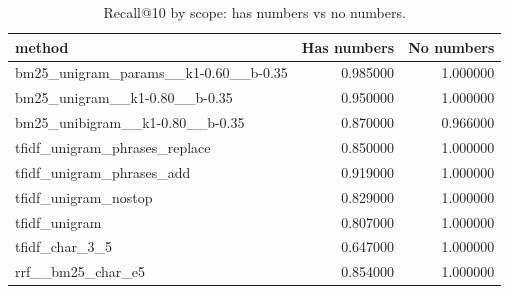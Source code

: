 \begin{table}
\caption{Recall@10 by scope: has numbers vs no numbers.}
\label{tab:recall10}
\begin{tabular}{lrr}
\toprule
method & Has numbers & No numbers \\
\midrule
bm25_unigram_params__k1-0.60__b-0.35 & 0.985000 & 1.000000 \\
bm25_unigram__k1-0.80__b-0.35 & 0.950000 & 1.000000 \\
bm25_unibigram__k1-0.80__b-0.35 & 0.870000 & 0.966000 \\
tfidf_unigram_phrases_replace & 0.850000 & 1.000000 \\
tfidf_unigram_phrases_add & 0.919000 & 1.000000 \\
tfidf_unigram_nostop & 0.829000 & 1.000000 \\
tfidf_unigram & 0.807000 & 1.000000 \\
tfidf_char_3_5 & 0.647000 & 1.000000 \\
rrf__bm25_char_e5 & 0.854000 & 1.000000 \\
\bottomrule
\end{tabular}
\end{table}
